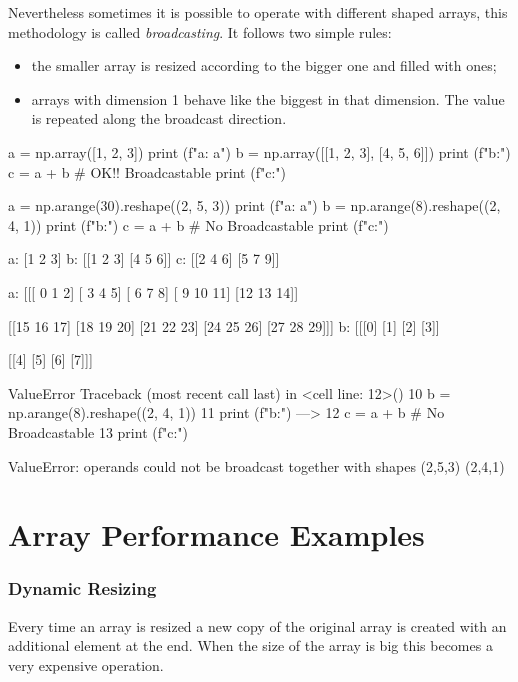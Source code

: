 Nevertheless sometimes it is possible to operate with different shaped arrays, this methodology is called \emph{broadcasting}. It follows two simple rules:
\begin{itemize}
\item the smaller array is resized according to the bigger one and filled with ones;
\item arrays with dimension 1 behave like the biggest in that dimension. The value is repeated along the broadcast direction.
\end{itemize}

\begin{ipythonnon}
a = np.array([1, 2, 3])
print (f"a: {a}")
b = np.array([[1, 2, 3], [4, 5, 6]])
print (f"b:")
c = a + b # OK!! Broadcastable
print (f"c:")
 
a = np.arange(30).reshape((2, 5, 3))
print (f"a: {a}")
b = np.arange(8).reshape((2, 4, 1)) 
print (f"b:")
c = a + b # No Broadcastable
print (f"c:")
\end{ipythonnon}
\begin{ioutput}
a: [1 2 3]
b:
[[1 2 3]
 [4 5 6]]
c:
[[2 4 6]
 [5 7 9]]
 
a: [[[ 0  1  2]
     [ 3  4  5]
     [ 6  7  8]
     [ 9 10 11]
     [12 13 14]]

    [[15 16 17]
     [18 19 20]
     [21 22 23]
     [24 25 26]
     [27 28 29]]]
b:
[[[0]
  [1]
  [2]
  [3]]

 [[4]
  [5]
  [6]
  [7]]]

ValueError
Traceback (most recent call last) in <cell line: 12>()
     10 b = np.arange(8).reshape((2, 4, 1))
     11 print (f"b:")
---> 12 c = a + b # No Broadcastable
     13 print (f"c:")

ValueError: operands could not be broadcast together with shapes (2,5,3) (2,4,1) 
\end{ioutput}

\section{Array Performance Examples}

\subsubsection{Dynamic Resizing}
Every time an array is resized a new copy of the original array is created with an additional element at the end. When the size of the array is big this becomes a very expensive operation.

